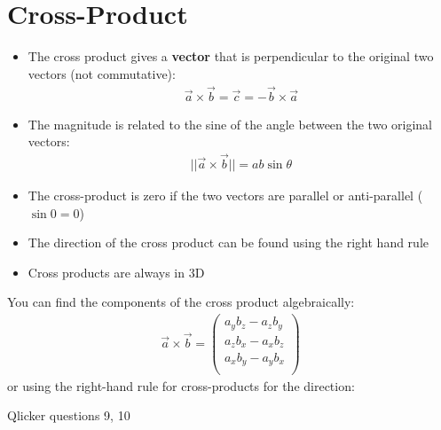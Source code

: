 \documentclass[aspectratio=169,
hyperref={colorlinks,urlcolor=blue}
]{beamer}
\begin{document}
\section{Cross-Product}
\label{sec:crossproduct}
{
\scriptsize
\begin{itemize}
\item The cross product gives a \textbf{vector} that is perpendicular to the original two vectors (not commutative):
\begin{align*}
\vec a \times \vec b = \vec c = -\vec b \times \vec a
\end{align*}
\item The magnitude is related to the sine of the angle between the two original vectors:
\begin{align*}
||\vec a \times \vec b ||= ab\sin\theta
\end{align*}
\item The cross-product is zero if the two vectors are parallel or anti-parallel ($\sin 0 =0$)
\item The direction of the cross product can be found using the right hand rule
\item Cross products are always in 3D
\end{itemize}
}
{
\scriptsize
You can find the components of the cross product algebraically:
\begin{align*}
\vec a \times \vec b =\begin{pmatrix}
           a_yb_z - a_z b_y\\
           a_zb_x - a_x b_z\\
           a_xb_y - a_y b_x\\
         \end{pmatrix}
\end{align*}
or using the right-hand rule for cross-products for the direction:
}

\begin{frame}{Qlicker questions 9, 10}

\end{frame}
\end{document}
